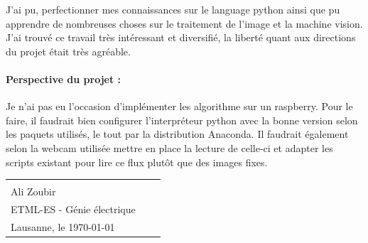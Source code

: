 J'ai pu, perfectionner mes connaissances sur le language python ainsi que pu apprendre de nombreuses choses sur le traitement de l'image et la machine vision. J'ai trouvé ce travail très intéressant et diversifié, la liberté quant aux directions du projet était très agréable.

\paragraph{Perspective du projet :} Je n'ai pas eu l'occasion d'implémenter les algorithme sur un raspberry. Pour le faire, il faudrait bien configurer l'interpréteur python avec la bonne version selon les paquets utilisés, le tout par la distribution Anaconda. Il faudrait également selon la webcam utilisée mettre en place la lecture de celle-ci et adapter les scripts existant pour lire ce flux plutôt que des images fixes.

\vspace{120mm}
\begin{tabular}{@{}p{}p{}p{}@{}}
	
	\hrulefill && \\
	Ali Zoubir && \\
	ETML-ES - Génie électrique \\
	Lausanne, le \today \\
\end{tabular}

